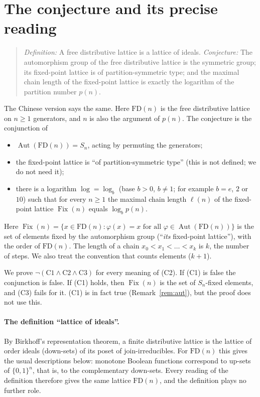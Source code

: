 \documentclass[11pt]{article}
\theoremstyle{definition}
\theoremstyle{remark}
\newcommand{\FD}{\mathrm{FD}}
\newcommand{\Aut}{\operatorname{Aut}}
\newcommand{\Fix}{\operatorname{Fix}}
\begin{document}
\section{The conjecture and its precise reading}
\begin{quote}
\emph{Definition:} A free distributive lattice is a lattice of ideals.
\emph{Conjecture:} The automorphism group of the free distributive lattice is
the symmetric group; its fixed-point lattice is of partition-symmetric type; and
the maximal chain length of the fixed-point lattice is exactly the logarithm of
the partition number $p(n)$.
\end{quote}
The Chinese version says the same. Here $\FD(n)$ is the free distributive lattice
on $n\ge1$ generators, and $n$ is also the argument of $p(n)$. The conjecture is
the conjunction of
\begin{itemize}
\item[(C1)] $\Aut(\FD(n))=S_n$, acting by permuting the generators;
\item[(C2)] the fixed-point lattice is ``of partition-symmetric type'' (this is
not defined; we do not need it);
\item[(C3)] there is a logarithm $\log=\log_b$ (base $b>0$, $b\ne1$; for example
$b=e$, $2$ or $10$) such that for every $n\ge1$ the maximal chain length
$\ell(n)$ of the fixed-point lattice $\Fix(n)$ equals $\log_b p(n)$.
\end{itemize}
Here $\Fix(n)=\{x\in\FD(n):\varphi(x)=x\text{ for all }\varphi\in\Aut(\FD(n))\}$
is the set of elements fixed by the automorphism group (``\emph{its}
fixed-point lattice''), with the order of $\FD(n)$. The length of a chain
$x_0<x_1<\dots<x_k$ is $k$, the number of steps. We also treat the convention
that counts elements ($k+1$).

We prove $\neg(\mathrm{C1}\wedge\mathrm{C2}\wedge\mathrm{C3})$ for every meaning
of (C2). If (C1) is false the conjunction is false. If (C1) holds, then $\Fix(n)$
is the set of $S_n$-fixed elements, and (C3) fails for it. (C1) is in fact true
(Remark~\ref{rem:aut}), but the proof does not use this.

\paragraph{The definition ``lattice of ideals''.} By Birkhoff's representation
theorem, a finite distributive lattice is the lattice of order ideals (down-sets)
of its poset of join-irreducibles. For $\FD(n)$ this gives the usual descriptions
below: monotone Boolean functions correspond to up-sets of $\{0,1\}^n$, that is,
to the complementary down-sets. Every reading of the definition therefore gives
the same lattice $\FD(n)$, and the definition plays no further role.
\end{document}
